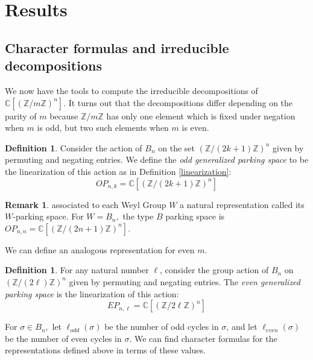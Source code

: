 \documentclass{amsart}
\theoremstyle{plain}
\theoremstyle{definition}
\newtheorem{definition}[theorem]{Definition}
\newtheorem{remark}[theorem]{Remark}
\newcommand{\C}{\mathbb{C}}
\newcommand{\Z}{\mathbb{Z}}
\begin{document}
\section{Results}\label{section: results}
\subsection{Character formulas and irreducible decompositions}
We now have the tools to compute the irreducible decompositions of $\C[(\Z/m\Z)^n].$ It turns out that the decompositions differ depending on the parity of $m$ because $\Z/m\Z$ has only one element which is fixed under negation when $m$ is odd, but two such elements when $m$ is even. 


\begin{definition}
    Consider the action of $B_n$ on the set $(\mathbb{Z}/(2k+1)\mathbb{Z})^n$ given by permuting and negating entries. We define the \textit{odd generalized parking space} to be the linearization of this action as in Definition \ref{linearization}:  $$OP_{n,k}=  \mathbb{C}[(\mathbb{Z}/(2k + 1)\mathbb{Z})^n]$$
    
\end{definition}
\begin{remark}
    \cite{ARR15} associated to each Weyl Group $W$ a natural representation called its $W$-parking space. For  $W=B_n,$ the type $B$ parking space is $OP_{n, n} = \mathbb{C}[(\Z/(2n+1)\Z)^n].$ 
\end{remark}

We can define an analogous representation for even $m.$

    
\begin{definition}
For any natural number $\ell$, consider the group action of $B_n$ on $(\mathbb{Z}/(2\ell)\mathbb{Z})^n$ given by permuting and negating entries. The \textit{even generalized parking space} is the linearization of this action: 
   $$ EP_{n,\ell} = \mathbb{C}[(\mathbb{Z}/2\ell\mathbb{Z})^n]$$

\end{definition}
For $\sigma\in B_n,$ let $\ell_{odd}(\sigma)$ be the number of odd cycles in $\sigma$, and let $\ell_{even}(\sigma)$ be the number of even cycles in $\sigma$. We can find character formulas for the representations defined above in terms of these values. 
\end{document}
